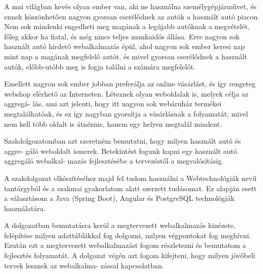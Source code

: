 
A mai világban kevés olyan ember van, aki ne használna személygépjárművet, és ennek köszönhetően nagyon gyorsan cserélődnek az autók a használt autó piacon. Nem sok mindenki engedheti meg magának a legújabb autóknak a megvételét, főleg akkor ha fiatal, és még nincs teljes munkaidős állása. Erre nagyon sok használt autó hirdető webalkalmazás épül, ahol nagyon sok ember keresi nap mint nap a magának megfelelő autót, és mivel gyorsan cserélődnek a használt autók, előbb-utóbb meg is fogja találni a számára megfelelőt.

Emellett nagyon sok ember jobban preferálja az online vásárlást, és így rengeteg webshop elérhető az Interneten. Léteznek olyan weboldalak is, melyek célja az aggregá-
lás, ami azt jelenti, hogy itt nagyon sok webáruház termékei megtalálhatóak, és ez így nagyban gyorsítja a vásárlásnak a folyamatát, mivel nem kell több oldalt is átnéznie, hanem egy helyen megtalál mindent.

Szakdolgozatomban azt szeretném bemutatni, hogy milyen használt autó és aggre-
gáló weboldalt ismerek. Betekintést fogunk kapni egy használt autó aggregáló webalkal-
mazás fejlesztésébe a tervezéstől a megvalósításig. 

A szakdolgozat elkészítéséhez majd fel tudom használni a Webtechnológiák nevű tantárgyból és a szakmai gyakorlatom alatt szerzett tudásomat. Ez alapján esett a választásom a Java (Spring Boot), Angular és PostgreSQL technológiák használatára.

A dolgozatban bemutatásra kerül a megtervezett webalkalmazás kinézete, felépítése milyen adattáblákkal fog dolgozni, milyen végpontokat fog meghívni. Ezután ezt a megtervezett webalkalmazást fogom részletezni és bemutatom a fejlesztés folyamatát.  A dolgozat végén azt fogom kifejteni, hogy milyen jövőbeli tervek lesznek az webalkalma-
zással kapcsolatban.